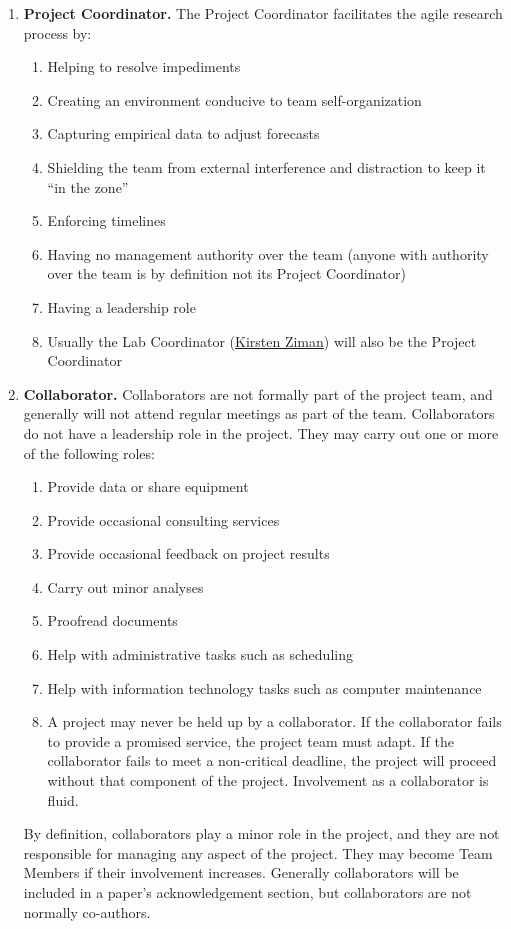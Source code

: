 \documentclass{tufte-book} %
\begin{document}
\begin{enumerate}
\item \textbf{Project Coordinator.} The Project Coordinator facilitates
  the agile research process by:
\begin{enumerate} 
\item Helping to resolve impediments
\item Creating an environment conducive to team self-organization
\item Capturing empirical data to adjust forecasts
\item Shielding the team from external interference and distraction to
  keep it ``in the zone''
\item Enforcing timelines
\item Having no management authority over the team (anyone with authority
  over the team is by definition not its Project
  Coordinator)
\item Having a leadership role
\item Usually the Lab Coordinator (\href{mailto:Kirsten.K.Ziman@dartmouth.edu}{Kirsten Ziman}) will also be the Project Coordinator
\end{enumerate}

\item \textbf{Collaborator.}  Collaborators are not formally part of
  the project team, and generally will not attend regular meetings as
  part of the team.  Collaborators do not have a leadership role in
  the project.  They may carry out one or more of the
  following roles:
\begin{enumerate}
\item Provide data or share equipment
\item Provide occasional consulting services
\item Provide occasional feedback on project results
\item Carry out minor analyses
\item Proofread documents
\item Help with administrative tasks such as scheduling
\item Help with information technology tasks such as computer
  maintenance
\item A project may never be held up by a collaborator.  If the
  collaborator fails to provide a promised service, the project team
  must adapt.  If the collaborator fails to meet a non-critical
  deadline, the project will proceed without that component of the
  project.  Involvement as a collaborator is fluid.
\end{enumerate}
By definition, collaborators play a minor role in the project, and they are not
responsible for managing any aspect of the project.  They may become Team
Members if their involvement increases.  Generally collaborators will
be included in a paper's acknowledgement section, but collaborators
are not normally co-authors.
\end{enumerate}
\end{document}
